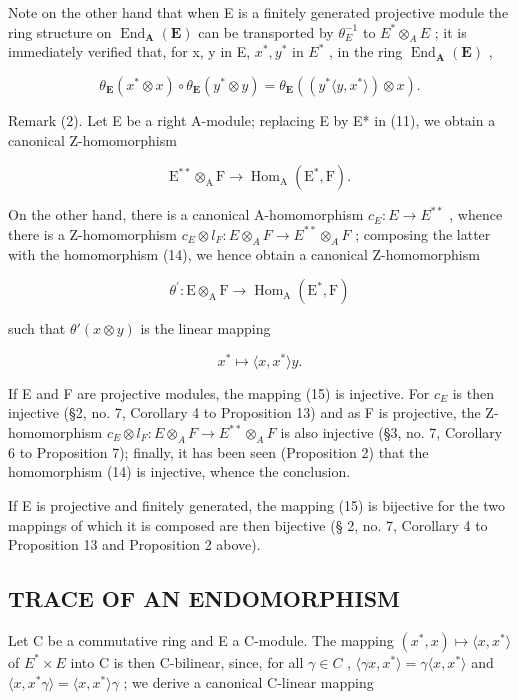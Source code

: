 Note on the other hand that when E is a finitely generated projective module the ring structure on \(\operatorname{End}_{\mathbf{A}}(\mathbf{E})\) can be transported by \(\theta_{E}^{-1}\) to \(E^{*}\otimes_{A}E\) ; it is immediately verified that, for x, y in E, \(x^{*}, y^{*}\) in \(E^{*}\) , in the ring \(\operatorname{End}_{\mathbf{A}}(\mathbf{E})\) ,

\[
\theta_ {\mathbf {E}} (x ^ {*} \otimes x) \circ \theta_ {\mathbf {E}} (y ^ {*} \otimes y) = \theta_ {\mathbf {E}} ((y ^ {*} \langle y, x ^ {*} \rangle) \otimes x).\tag{13}
\]

Remark (2). Let E be a right A-module; replacing E by E* in (11), we obtain a canonical Z-homomorphism

\[
\mathrm{E} ^ {* *} \otimes_ {\mathrm{A}} \mathrm{F} \rightarrow \operatorname{Hom} _ {\mathrm{A}} (\mathrm{E} ^ {*}, \mathrm{F}).\tag{14}
\]

On the other hand, there is a canonical A-homomorphism \(c_{E}:E\to E^{**}\) , whence there is a Z-homomorphism \(c_{E}\otimes l_{F}:E\otimes_{A}F\to E^{**}\otimes_{A}F\) ; composing the latter with the homomorphism (14), we hence obtain a canonical Z-homomorphism

\[
\theta^ {\prime}: \mathrm{E} \otimes_ {\mathrm{A}} \mathrm{F} \rightarrow \operatorname{Hom} _ {\mathrm{A}} (\mathrm{E} ^ {*}, \mathrm{F})\tag{15}
\]

such that \(\theta'(x \otimes y)\) is the linear mapping

\[
x ^ {*} \mapsto \langle x, x ^ {*} \rangle y.
\]

If E and F are projective modules, the mapping (15) is injective. For \(c_{E}\) is then injective (§2, no. 7, Corollary 4 to Proposition 13) and as F is projective, the Z-homomorphism \(c_{E} \otimes l_{F}: E \otimes_{A} F \to E^{**} \otimes_{A} F\) is also injective (§3, no. 7, Corollary 6 to Proposition 7); finally, it has been seen (Proposition 2) that the homomorphism (14) is injective, whence the conclusion.

If E is projective and finitely generated, the mapping (15) is bijective for the two mappings of which it is composed are then bijective (§ 2, no. 7, Corollary 4 to Proposition 13 and Proposition 2 above).

\subsection{TRACE OF AN ENDOMORPHISM}

Let C be a commutative ring and E a C-module. The mapping \((x^{*}, x) \mapsto \langle x, x^{*} \rangle\) of \(E^{*} \times E\) into C is then C-bilinear, since, for all \(\gamma \in C\) , \(\langle \gamma x, x^{*} \rangle = \gamma \langle x, x^{*} \rangle\) and \(\langle x, x^{*} \gamma \rangle = \langle x, x^{*} \rangle \gamma\) ; we derive a canonical C-linear mapping

